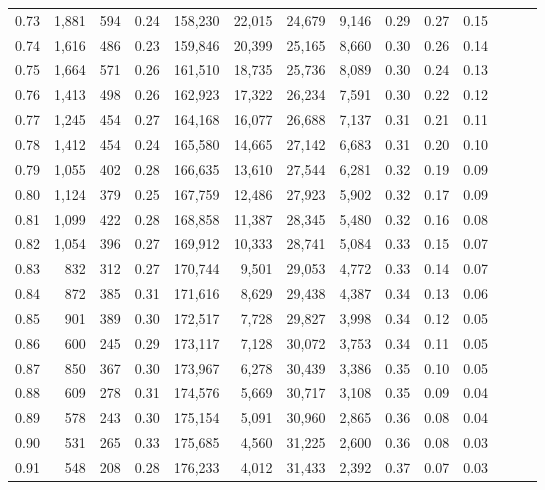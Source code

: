 \begin{tabular}{rrrrrrrrrrrrrr}
0.73 &  1,881 &  594 &  0.24 &  158,230 &   22,015 &  24,679 &   9,146 &  0.29 &  0.27 &      0.15 \\
0.74 &  1,616 &  486 &  0.23 &  159,846 &   20,399 &  25,165 &   8,660 &  0.30 &  0.26 &      0.14 \\
0.75 &  1,664 &  571 &  0.26 &  161,510 &   18,735 &  25,736 &   8,089 &  0.30 &  0.24 &      0.13 \\
0.76 &  1,413 &  498 &  0.26 &  162,923 &   17,322 &  26,234 &   7,591 &  0.30 &  0.22 &      0.12 \\
0.77 &  1,245 &  454 &  0.27 &  164,168 &   16,077 &  26,688 &   7,137 &  0.31 &  0.21 &      0.11 \\
0.78 &  1,412 &  454 &  0.24 &  165,580 &   14,665 &  27,142 &   6,683 &  0.31 &  0.20 &      0.10 \\
0.79 &  1,055 &  402 &  0.28 &  166,635 &   13,610 &  27,544 &   6,281 &  0.32 &  0.19 &      0.09 \\
0.80 &  1,124 &  379 &  0.25 &  167,759 &   12,486 &  27,923 &   5,902 &  0.32 &  0.17 &      0.09 \\
0.81 &  1,099 &  422 &  0.28 &  168,858 &   11,387 &  28,345 &   5,480 &  0.32 &  0.16 &      0.08 \\
0.82 &  1,054 &  396 &  0.27 &  169,912 &   10,333 &  28,741 &   5,084 &  0.33 &  0.15 &      0.07 \\
0.83 &    832 &  312 &  0.27 &  170,744 &    9,501 &  29,053 &   4,772 &  0.33 &  0.14 &      0.07 \\
0.84 &    872 &  385 &  0.31 &  171,616 &    8,629 &  29,438 &   4,387 &  0.34 &  0.13 &      0.06 \\
0.85 &    901 &  389 &  0.30 &  172,517 &    7,728 &  29,827 &   3,998 &  0.34 &  0.12 &      0.05 \\
0.86 &    600 &  245 &  0.29 &  173,117 &    7,128 &  30,072 &   3,753 &  0.34 &  0.11 &      0.05 \\
0.87 &    850 &  367 &  0.30 &  173,967 &    6,278 &  30,439 &   3,386 &  0.35 &  0.10 &      0.05 \\
0.88 &    609 &  278 &  0.31 &  174,576 &    5,669 &  30,717 &   3,108 &  0.35 &  0.09 &      0.04 \\
0.89 &    578 &  243 &  0.30 &  175,154 &    5,091 &  30,960 &   2,865 &  0.36 &  0.08 &      0.04 \\
0.90 &    531 &  265 &  0.33 &  175,685 &    4,560 &  31,225 &   2,600 &  0.36 &  0.08 &      0.03 \\
0.91 &    548 &  208 &  0.28 &  176,233 &    4,012 &  31,433 &   2,392 &  0.37 &  0.07 &      0.03 \\

\end{tabular}
